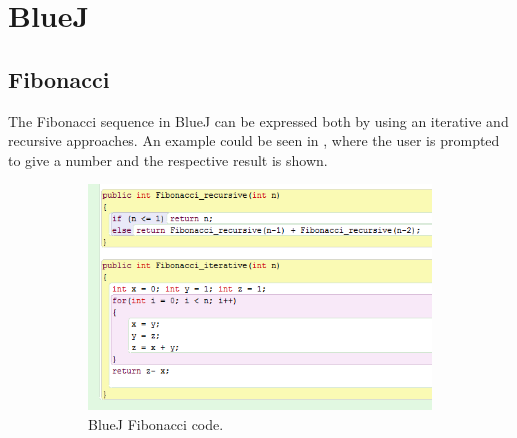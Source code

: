 \section{BlueJ}
\label{sec:bluej}


\subsection{Fibonacci}
The Fibonacci sequence in BlueJ can be expressed both by using an iterative and recursive approaches. An example could be seen in , where the user is prompted to give a number and the respective result is shown.

\begin{figure}[!h]
  \centering
    \begin{subfigure}[b]{0.45\textwidth}
    \begin{center}
      \includegraphics[scale=0.7]{./pics/bluej_fibo_code}
      \caption{BlueJ Fibonacci code.}
      \label{fig:bluej_fibo_code}
    \end{center}
    \end{subfigure}
    ~
    \begin{subfigure}[b]{0.45\textwidth}
    \begin{center}

\end{center}
\end{subfigure}
\end{figure}
